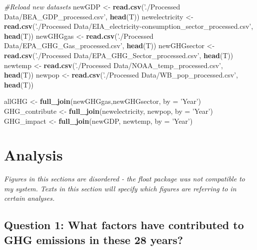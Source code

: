 \documentclass[12pt,]{article}
\newenvironment{Shaded}{\begin{snugshade}}{\end{snugshade}}
\newcommand{\KeywordTok}[1]{\textcolor[rgb]{0.13,0.29,0.53}{\textbf{#1}}}
\newcommand{\DataTypeTok}[1]{\textcolor[rgb]{0.13,0.29,0.53}{#1}}
\newcommand{\StringTok}[1]{\textcolor[rgb]{0.31,0.60,0.02}{#1}}
\newcommand{\CommentTok}[1]{\textcolor[rgb]{0.56,0.35,0.01}{\textit{#1}}}
\newcommand{\NormalTok}[1]{#1}
\begin{document}
\begin{Shaded}
\begin{Highlighting}[]
\CommentTok{#Reload new datasets}
\NormalTok{newGDP <-}\StringTok{ }\KeywordTok{read.csv}\NormalTok{(}\StringTok{'./Processed Data/BEA_GDP_processed.csv'}\NormalTok{, }\KeywordTok{head}\NormalTok{(T))}
\NormalTok{newelectricity <-}\StringTok{ }\KeywordTok{read.csv}\NormalTok{(}\StringTok{'./Processed Data/EIA_electricity-consumption_sector_processed.csv'}\NormalTok{, }\KeywordTok{head}\NormalTok{(T))}
\NormalTok{newGHGgas <-}\StringTok{ }\KeywordTok{read.csv}\NormalTok{(}\StringTok{'./Processed Data/EPA_GHG_Gas_processed.csv'}\NormalTok{, }\KeywordTok{head}\NormalTok{(T))}
\NormalTok{newGHGsector <-}\StringTok{ }\KeywordTok{read.csv}\NormalTok{(}\StringTok{'./Processed Data/EPA_GHG_Sector_processed.csv'}\NormalTok{, }\KeywordTok{head}\NormalTok{(T))}
\NormalTok{newtemp <-}\StringTok{ }\KeywordTok{read.csv}\NormalTok{(}\StringTok{'./Processed Data/NOAA_temp_processed.csv'}\NormalTok{, }\KeywordTok{head}\NormalTok{(T))}
\NormalTok{newpop <-}\StringTok{ }\KeywordTok{read.csv}\NormalTok{(}\StringTok{'./Processed Data/WB_pop_processed.csv'}\NormalTok{, }\KeywordTok{head}\NormalTok{(T))}

\NormalTok{allGHG <-}\StringTok{ }\KeywordTok{full_join}\NormalTok{(newGHGgas,newGHGsector, }\DataTypeTok{by =} \StringTok{'Year'}\NormalTok{)}
\NormalTok{GHG_contribute <-}\StringTok{ }\KeywordTok{full_join}\NormalTok{(newelectricity, newpop, }\DataTypeTok{by =} \StringTok{'Year'}\NormalTok{)}
\NormalTok{GHG_impact <-}\StringTok{ }\KeywordTok{full_join}\NormalTok{(newGDP, newtemp, }\DataTypeTok{by =} \StringTok{'Year'}\NormalTok{)}
\end{Highlighting}
\end{Shaded}

\newpage

\section{Analysis}\label{analysis}

\emph{Figures in this sections are disordered - the float package was
not compatible to my system. Texts in this section will specify which
figures are referring to in certain analyses.}

\subsection{Question 1: What factors have contributed to GHG emissions
in these 28
years?}\label{question-1-what-factors-have-contributed-to-ghg-emissions-in-these-28-years}
\end{document}
